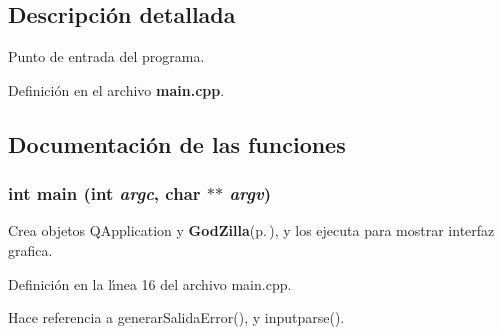 \subsection{Descripci\'{o}n detallada}
Punto de entrada del programa. 



Definici\'{o}n en el archivo {\bf main.cpp}.

\subsection{Documentaci\'{o}n de las funciones}
\subsubsection{\setlength{\rightskip}{0pt plus 5cm}int main (int {\em argc}, char $\ast$$\ast$ {\em argv})}\label{main_8cpp_a0}


Crea objetos QApplication y {\bf God\-Zilla}{\rm (p.\,\pageref{classGodZilla})}, y los ejecuta para mostrar interfaz grafica. 



Definici\'{o}n en la l\'{\i}nea 16 del archivo main.cpp.

Hace referencia a generar\-Salida\-Error(), y inputparse().